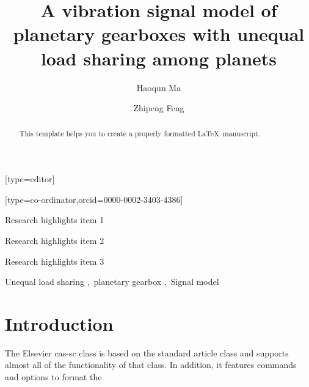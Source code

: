 \documentclass[a4paper,fleqn]{cas-sc}
\begin{document}
\let\WriteBookmarks\relax
\def\floatpagepagefraction{1}
\def\textpagefraction{.001}

\title[mode = title]{A vibration signal model of planetary gearboxes with unequal load sharing among planets}
\author[1]{Haoqun Ma}[type=editor]
\address[1]{University of Science and Technology Beijing, No.30, Xueyuan Road, Haidian District, Beijing.}
\author[1]{Zhipeng Feng}[type=co-ordinator,orcid=0000-0002-3403-4386]
\cormark[1]
\begin{abstract}
    This template helps you to create a properly formatted \LaTeX\ manuscript.
\end{abstract}
\begin{highlights}
    \item Research highlights item 1
    \item Research highlights item 2
    \item Research highlights item 3
\end{highlights}
\begin{keywords}
    Unequal load sharing \sep\ planetary gearbox \sep\ Signal model
\end{keywords}
    
\maketitle
\section{Introduction}

The Elsevier cas-sc class is based on the standard article class and supports almost all of the functionality of that class. In addition, it features commands and options to format the
\end{document}
